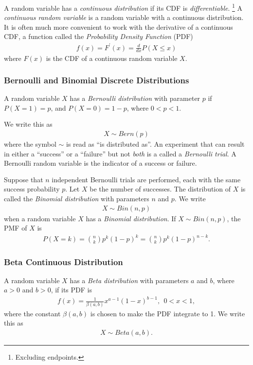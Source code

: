 A random variable has a \emph{continuous distribution} if its 
CDF is \emph{differentiable}.%
\footnote{Excluding endpoints.} 
A \emph{continuous random variable} is a random variable with a continuous distribution. 
It is often much more convenient to work 
with the derivative of a continuous CDF, 
a function called the \emph{Probability Density Function} (PDF)
\begin{align}
f(x) = F^\prime(x) = \frac{d}{dx}P(X \leq x)
\end{align}
where \(F(x)\) is the CDF of a continuous random variable \(X\).


\subsubsection{Bernoulli and Binomial Discrete Distributions}

A random variable \(X\) has a \emph{Bernoulli distribution} 
with parameter \(p\) if \(P(X = 1) = p\), 
and \(P(X = 0) = 1 - p\), 
where \(0 < p < 1\).

We write this as
\begin{align}
X \sim Bern(p)
\end{align}
where the symbol \(\sim\) is read as ``is distributed as''. 
An experiment that can result in either 
a ``success'' or a ``failure'' but not \emph{both} 
is a called a \emph{Bernoulli trial}. 
A Bernoulli random variable is the indicator of a success or failure.

Suppose that \(n\) independent Bernoulli trials are performed, 
each with the same success probability \(p\). 
Let \(X\) be the number of successes. 
The distribution of \(X\) is called the \emph{Binomial distribution} 
with parameters \(n\) and \(p\). 
We write
\begin{align}
X \sim Bin(n,p)
\end{align}
when a random variable \(X\) has a \emph{Binomial distribution}. 
If \(X \sim Bin(n,p)\), 
the PMF of \(X\) is
\begin{align}
P(X = k) = \binom{n}{k}p^{k}(1 - p)^{k} = 
\binom{n}{k}p^{k}(1 - p)^{n - k}.
\end{align}

\subsubsection{Beta Continuous Distribution}

A random variable \(X\) has a \emph{Beta distribution} with parameters \(a\) and \(b\), 
where \(a > 0\) and \(b > 0\), 
if its PDF is
\begin{align}
f(x) = \frac{1}{\beta(a,b)}x^{a - 1}(1 - x)^{b - 1},\ \ 0 < x < 1,
\end{align}
where the constant \(\beta(a,b)\) is chosen to make the PDF integrate to 1. 
We write this as
\begin{align}
X \sim Beta(a,b).
\end{align}

